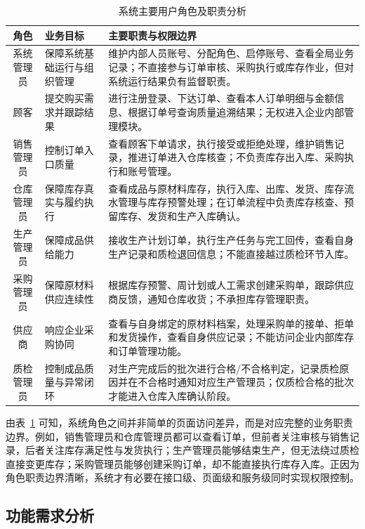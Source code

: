 \begin{table}[htbp]
\centering
\footnotesize
\caption{系统主要用户角色及职责分析}
\label{tab:roles-analysis-real}
\begin{tabular}{|c|p{3.4cm}|p{7.8cm}|}
\hline
角色 & 业务目标 & 主要职责与权限边界 \\\hline
系统管理员 & 保障系统基础运行与组织管理 & 维护内部人员账号、分配角色、启停账号、查看全局业务记录；不直接参与订单审核、采购执行或库存作业，但对系统运行结果负有监督职责。 \\\hline
顾客 & 提交购买需求并跟踪结果 & 进行注册登录、下达订单、查看本人订单明细与金额信息、根据订单号查询质量追溯结果；无权进入企业内部管理模块。 \\\hline
销售管理员 & 控制订单入口质量 & 查看顾客下单请求，执行接受或拒绝处理，维护销售记录，推进订单进入仓库核查；不负责库存出入库、采购执行和账号管理。 \\\hline
仓库管理员 & 保障库存真实与履约执行 & 查看成品与原材料库存，执行入库、出库、发货、库存流水管理与库存预警处理；在订单流程中负责库存核查、预留库存、发货和生产入库确认。 \\\hline
生产管理员 & 保障成品供给能力 & 接收生产计划订单，执行生产任务与完工回传，查看自身生产记录和质检退回信息；不能直接越过质检环节入库。 \\\hline
采购管理员 & 保障原材料供应连续性 & 根据库存预警、周计划或人工需求创建采购单，跟踪供应商反馈，通知仓库收货；不承担库存管理职责。 \\\hline
供应商 & 响应企业采购协同 & 查看与自身绑定的原材料档案，处理采购单的接单、拒单和发货操作，查看自身供应记录；不能访问企业内部库存和订单管理功能。 \\\hline
质检管理员 & 控制成品质量与异常闭环 & 对生产完成后的批次进行合格/不合格判定，记录质检原因并在不合格时通知对应生产管理员；仅质检合格的批次才能进入仓库入库确认阶段。 \\\hline
\end{tabular}
\end{table}

由表~\ref{tab:roles-analysis-real} 可知，系统角色之间并非简单的页面访问差异，而是对应完整的业务职责边界。例如，销售管理员和仓库管理员都可以查看订单，但前者关注审核与销售记录，后者关注库存满足性与发货执行；生产管理员能够结束生产，但无法绕过质检直接变更库存；采购管理员能够创建采购订单，却不能直接执行库存入库。正因为角色职责边界清晰，系统才有必要在接口级、页面级和服务级同时实现权限控制。

\subsection{功能需求分析}

